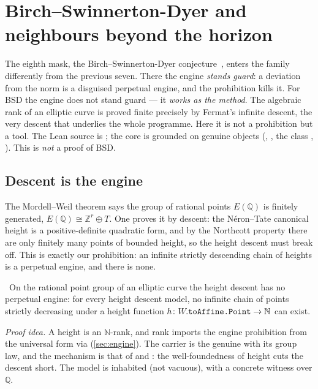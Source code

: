 \section{Birch–Swinnerton-Dyer and neighbours beyond the horizon}\label{sec:bsd}

The eighth mask, the Birch–Swinnerton-Dyer conjecture~\cite{clay-bsd}, enters the
family differently from the previous seven. There the engine \emph{stands guard}: a deviation from
the norm is a disguised perpetual engine, and the prohibition kills it. For BSD the engine does not
stand guard --- it \emph{works as the method}. The algebraic rank of an elliptic curve is proved
finite precisely by Fermat's infinite descent, the very descent that underlies the whole programme.
Here it is not a prohibition but a tool. The Lean source is ; the core is
grounded on genuine  objects (,
, the class , ).
This is \emph{not} a proof of BSD.

\subsection{Descent is the engine}

The Mordell–Weil theorem says the group of rational points $E(\mathbb{Q})$ is finitely generated,
$E(\mathbb{Q})\cong\mathbb{Z}^r\oplus T$. One proves it by descent: the Néron–Tate canonical height
is a positive-definite quadratic form, and by the Northcott property there are only finitely many
points of bounded height, so the height descent must break off. This is exactly our prohibition: an
infinite strictly descending chain of heights is a perpetual engine, and there is none.

\begin{theorem}\label{thm:bsd_descent_has_no_engine}
\green{}\ On the rational point group of an elliptic curve the height descent has no perpetual
engine: for every height descent model, no infinite chain of points strictly decreasing under a
height function $h\colon W.\texttt{toAffine.Point}\to\mathbb{N}$ can exist.
\end{theorem}

\emph{Proof idea.} A height is an $\mathbb{N}$-rank, and rank imports the engine prohibition from
the universal form via 
(\cref{sec:engine}). The carrier is the genuine  with its group
law, and the mechanism is that of  and : the
well-foundedness of height cuts the descent short. The model is inhabited (not vacuous), with a
concrete witness over $\mathbb{Q}$.

